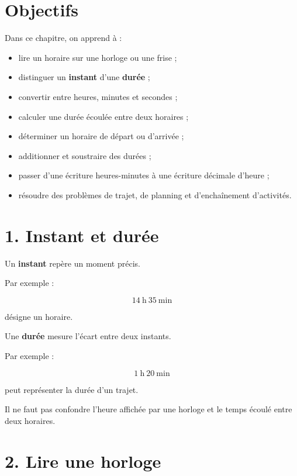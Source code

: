
\section{Objectifs}

Dans ce chapitre, on apprend à :

\begin{itemize}
\item lire un horaire sur une horloge ou une frise ;
\item distinguer un \textbf{instant} d’une \textbf{durée} ;
\item convertir entre heures, minutes et secondes ;
\item calculer une durée écoulée entre deux horaires ;
\item déterminer un horaire de départ ou d’arrivée ;
\item additionner et soustraire des durées ;
\item passer d’une écriture heures-minutes à une écriture décimale d’heure ;
\item résoudre des problèmes de trajet, de planning et d’enchaînement d’activités.
\end{itemize}

\section{1. Instant et durée}

Un \textbf{instant} repère un moment précis.

Par exemple :

\[
14\ \text{h}\ 35\ \text{min}
\]

désigne un horaire.

Une \textbf{durée} mesure l’écart entre deux instants.

Par exemple :

\[
1\ \text{h}\ 20\ \text{min}
\]

peut représenter la durée d’un trajet.

Il ne faut pas confondre l’heure affichée par une horloge et le temps écoulé entre deux horaires.

\section{2. Lire une horloge}



